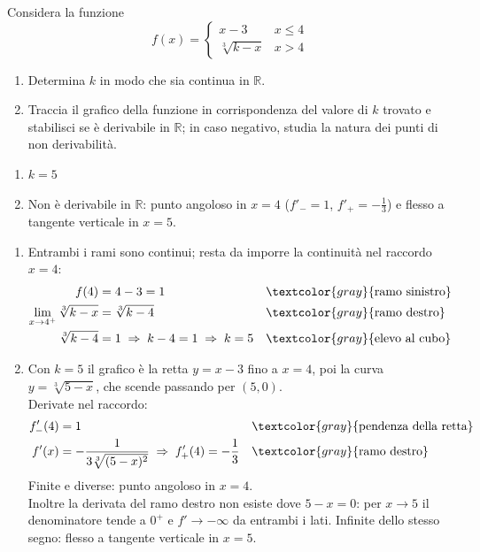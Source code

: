 \begin{question}[ID=2.1, subtitle={Continuità e derivabilità di $f$ a tratti con parametro $k$}, tags={non derivabilità, continuità, parametrico}, difficulty=media]
Considera la funzione
\[
f(x) = \begin{cases}
    x-3 & x \le 4 \\
    \sqrt[3]{k-x} & x > 4
\end{cases}
\]
\begin{enumerate}
    \item Determina $k$ in modo che sia continua in $\mathbb{R}$.
    \item Traccia il grafico della funzione in corrispondenza del valore di $k$ trovato e stabilisci se è derivabile in $\mathbb{R}$; in caso negativo, studia la natura dei punti di non derivabilità.
\end{enumerate}
\begin{solution}
\begin{enumerate}
    \item $k=5$
    \item Non è derivabile in $\mathbb{R}$: punto angoloso in $x=4$ ($f'_-=1$, $f'_+=-\tfrac13$) e flesso a tangente verticale in $x=5$.
\end{enumerate}
\end{solution}
\begin{explanation}
\begin{enumerate}
    \item Entrambi i rami sono continui; resta da imporre la continuità nel raccordo $x=4$:
    \[\begin{aligned}
    f(4) &= 4-3=1 && \textcolor{gray}{\text{ramo sinistro}}\\
    \lim_{x\to4^+}\sqrt[3]{k-x} &= \sqrt[3]{k-4} && \textcolor{gray}{\text{ramo destro}}\\
    \sqrt[3]{k-4} &= 1 \;\Rightarrow\; k-4=1 \;\Rightarrow\; k=5 && \textcolor{gray}{\text{elevo al cubo}}
    \end{aligned}\]
    \item Con $k=5$ il grafico è la retta $y=x-3$ fino a $x=4$, poi la curva $y=\sqrt[3]{5-x}$, che scende passando per $(5,0)$. \\
    Derivate nel raccordo:
    \[\begin{aligned}
    f'_-(4) &= 1 && \textcolor{gray}{\text{pendenza della retta}}\\
    f'(x) &= -\dfrac{1}{3\sqrt[3]{(5-x)^2}} \;\Rightarrow\; f'_+(4)=-\dfrac13 && \textcolor{gray}{\text{ramo destro}}
    \end{aligned}\]
    Finite e diverse: punto angoloso in $x=4$. \\
    Inoltre la derivata del ramo destro non esiste dove $5-x=0$: per $x\to5$ il denominatore tende a $0^+$ e $f'\to-\infty$ da entrambi i lati. Infinite dello stesso segno: flesso a tangente verticale in $x=5$.
\end{enumerate}
\end{explanation}
\end{question}

